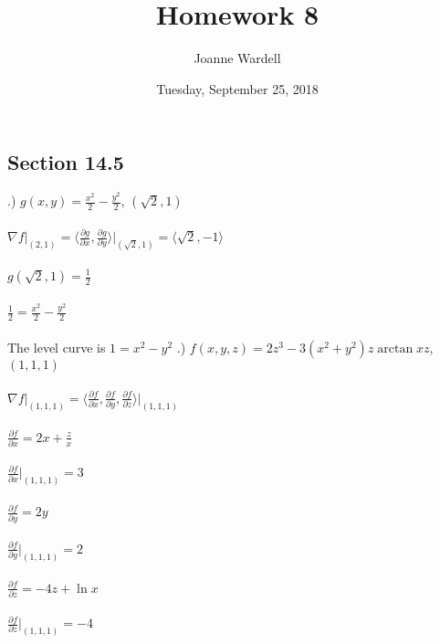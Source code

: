 \documentclass[12pt]{article}
\title{\vspace{-2.0cm}Homework 8}
\author{Joanne Wardell}
\date{Tuesday, September 25, 2018}
\begin{document}
\maketitle

\subsection*{Section 14.5}

.) $g(x,y) = \frac{x^{2}}{2} -\frac{y^{2}}{2}$, \hspace{10pt} $(\sqrt{2},1)$\\\\
\noindent $\nabla f \Big|_{(2,1)} = \langle \frac{\partial g}{\partial x}, \frac{\partial g}{\partial y} \rangle \Big|_{(\sqrt{2}, 1)}
= \langle \sqrt{2}, -1\rangle$\\\\
\noindent $g(\sqrt{2}, 1) = \frac{1}{2}$\\\\
\noindent $\frac{1}{2} = \frac{x^{2}}{2} - \frac{y^{2}}{2}$\\\\
\noindent The level curve is $1 = x^{2} - y^{2}$
.) $f(x, y, z) = 2z^{3} - 3(x^{2} + y^{2})z \arctan{xz}$, \hspace{10pt} $(1,1,1)$\\\\
\noindent $\nabla f \Big|_{(1,1,1)} = \langle \frac{\partial f}{\partial x}, \frac{\partial f}{\partial y}, \frac{\partial f}{\partial z} \rangle \Big|_{(1,1,1)}$\\\\
\noindent $\frac{\partial f}{\partial x} = 2x + \frac{z}{x}$\\\\
\noindent $\frac{\partial f}{\partial x}\Big|_{(1, 1, 1)} = 3$\\\\

\noindent $\frac{\partial f}{\partial y} = 2y$\\\\
\noindent $\frac{\partial f}{\partial y}\Big|_{(1, 1, 1)} = 2$\\\\

\noindent $\frac{\partial f}{\partial z} = -4z+\ln{x}$\\\\
\noindent $\frac{\partial f}{\partial z}\Big|_{(1, 1, 1)} = -4$\\\\
\end{document}
